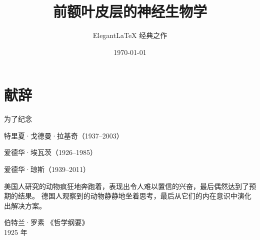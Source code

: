 \documentclass[cn,10pt,citestyle=gb7714-2015, bibstyle=gb7714-2015]{elegantbook}
\title{前额叶皮层的神经生物学}
\subtitle{Elegant\LaTeX{} 经典之作}
\institute{OpenHUTB}
\date{\today}
\begin{document}
\maketitle
\frontmatter

\chapter*{献辞}



\begin{center}
为了纪念

特里夏·戈德曼·拉基奇（1937–2003）

爱德华·埃瓦茨（1926–1985）

爱德华·琼斯（1939–2011）
\end{center}


\vskip 1.5cm

美国人研究的动物疯狂地奔跑着，表现出令人难以置信的兴奋，最后偶然达到了预期的结果。
德国人观察到的动物静静地坐着思考，最后从它们的内在意识中演化出解决方案。


\vskip 0.5cm


\vskip 1.5cm

\begin{flushright}
伯特兰·罗素  《哲学纲要》\\
1925 年
\end{flushright}

\tableofcontents

\mainmatter

















\nocite{*} 
\printbibliography
\end{document}
